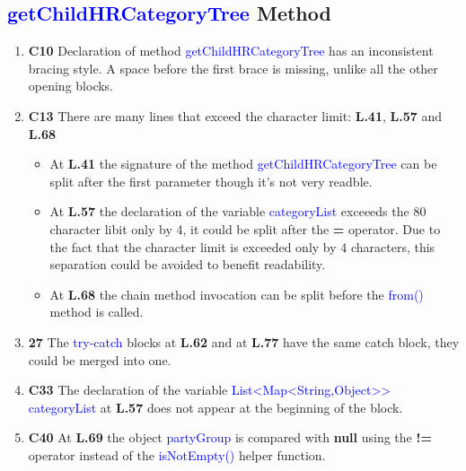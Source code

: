 \subsection{\textcolor{blue}{getChildHRCategoryTree} Method}

\begin{enumerate}

  \item \textbf{C10} Declaration of method \textcolor{blue}{getChildHRCategoryTree}
    has an inconsistent bracing style. A space before the first brace is
    missing, unlike all the other opening blocks.

  \item \textbf{C13} There are many lines that exceed the
    character limit: \textbf{L.41}, \textbf{L.57} and \textbf{L.68}

    \begin{itemize}

      \item At \textbf{L.41} the signature of the method
        \textcolor{blue}{getChildHRCategoryTree} can be split after the first
        parameter though it's not very readble.

      \item At \textbf{L.57} the declaration of the variable
        \textcolor{blue}{categoryList} exceeeds the 80 character libit only by
        4, it could be split after the \textbf{=} operator. Due to the fact that
        the character limit is exceeded only by 4 characters, this separation
        could be avoided to benefit readability.

      \item At \textbf{L.68} the chain method invocation can be split before the
        \textcolor{blue}{from()} method is called.

    \end{itemize}

  \item \textbf{27} The \textcolor{blue}{try-catch} blocks at \textbf{L.62} and
    at \textbf{L.77} have the same catch block, they could be merged into one.

  \item \textbf{C33} The declaration of the variable
    \textcolor{blue}{List<Map<String,Object>> categoryList} at \textbf{L.57}
    does not appear at the beginning of the block.

  \item \textbf{C40} At \textbf{L.69} the object \textcolor{blue}{partyGroup} is
    compared with \textbf{null} using the \textbf{!=} operator instead of the
    \textcolor{blue}{isNotEmpty()} helper function.


\end{enumerate}
